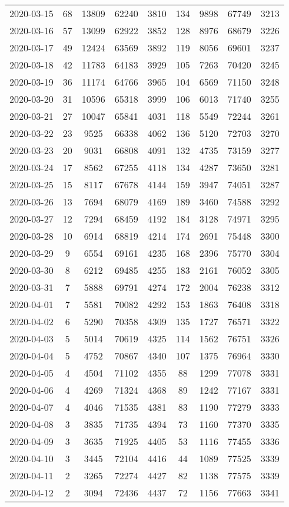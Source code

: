 \begin{longtable}{ccccccccc}
2020-03-15&68&13809&62240&3810&134&9898&67749&3213\\
2020-03-16&57&13099&62922&3852&128&8976&68679&3226\\
2020-03-17&49&12424&63569&3892&119&8056&69601&3237\\
2020-03-18&42&11783&64183&3929&105&7263&70420&3245\\
2020-03-19&36&11174&64766&3965&104&6569&71150&3248\\
2020-03-20&31&10596&65318&3999&106&6013&71740&3255\\
2020-03-21&27&10047&65841&4031&118&5549&72244&3261\\
2020-03-22&23&9525&66338&4062&136&5120&72703&3270\\
2020-03-23&20&9031&66808&4091&132&4735&73159&3277\\
2020-03-24&17&8562&67255&4118&134&4287&73650&3281\\
2020-03-25&15&8117&67678&4144&159&3947&74051&3287\\
2020-03-26&13&7694&68079&4169&189&3460&74588&3292\\
2020-03-27&12&7294&68459&4192&184&3128&74971&3295\\
2020-03-28&10&6914&68819&4214&174&2691&75448&3300\\
2020-03-29&9&6554&69161&4235&168&2396&75770&3304\\
2020-03-30&8&6212&69485&4255&183&2161&76052&3305\\
2020-03-31&7&5888&69791&4274&172&2004&76238&3312\\
2020-04-01&7&5581&70082&4292&153&1863&76408&3318\\
2020-04-02&6&5290&70358&4309&135&1727&76571&3322\\
2020-04-03&5&5014&70619&4325&114&1562&76751&3326\\
2020-04-04&5&4752&70867&4340&107&1375&76964&3330\\
2020-04-05&4&4504&71102&4355&88&1299&77078&3331\\
2020-04-06&4&4269&71324&4368&89&1242&77167&3331\\
2020-04-07&4&4046&71535&4381&83&1190&77279&3333\\
2020-04-08&3&3835&71735&4394&73&1160&77370&3335\\
2020-04-09&3&3635&71925&4405&53&1116&77455&3336\\
2020-04-10&3&3445&72104&4416&44&1089&77525&3339\\
2020-04-11&2&3265&72274&4427&82&1138&77575&3339\\
2020-04-12&2&3094&72436&4437&72&1156&77663&3341\\

\end{longtable}
